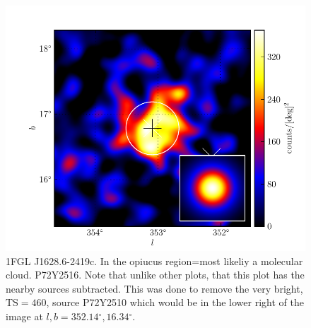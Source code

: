 \documentclass[preprint]{aastex}
\newcommand{\ts}{\text{TS}\xspace}
\renewcommand{\deg}{\ensuremath{^\circ}\xspace}
\begin{document}
  \begin{figure}
    \begin{center}
      \includegraphics[type=pdf,ext=.pdf,read=.pdf]{source_plots/source_1FGL_J1628.6-2419c}
    \end{center}
    \caption{1FGL J1628.6-2419c. In the opiucus region=most likeliy a molecular cloud.
    P72Y2516.
    Note that unlike other plots, that this plot has the nearby sources subtracted.
    This was done to remove the very bright, $\ts=460$, source P72Y2510 %
    which would be in the lower right of the image at $l,b=352.14\deg,16.34\deg$.
    }
  \end{figure}
\end{document}
